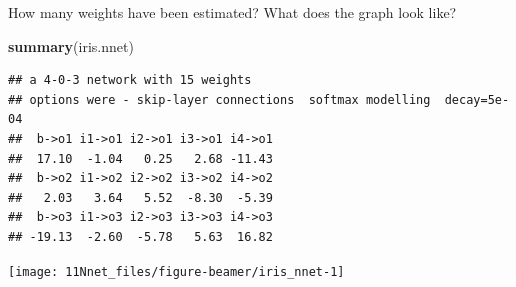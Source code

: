 \documentclass[10pt,ignorenonframetext,]{beamer}
\newenvironment{Shaded}{\begin{snugshade}}{\end{snugshade}}
\newcommand{\KeywordTok}[1]{\textcolor[rgb]{0.13,0.29,0.53}{\textbf{#1}}}
\newcommand{\NormalTok}[1]{#1}
\begin{document}
\begin{frame}[fragile]

How many weights have been estimated? What does the graph look like?

\scriptsize

\begin{Shaded}
\begin{Highlighting}[]
\KeywordTok{summary}\NormalTok{(iris.nnet)}
\end{Highlighting}
\end{Shaded}

\begin{verbatim}
## a 4-0-3 network with 15 weights
## options were - skip-layer connections  softmax modelling  decay=5e-04
##  b->o1 i1->o1 i2->o1 i3->o1 i4->o1 
##  17.10  -1.04   0.25   2.68 -11.43 
##  b->o2 i1->o2 i2->o2 i3->o2 i4->o2 
##   2.03   3.64   5.52  -8.30  -5.39 
##  b->o3 i1->o3 i2->o3 i3->o3 i4->o3 
## -19.13  -2.60  -5.78   5.63  16.82
\end{verbatim}

\end{frame}

\begin{frame}

\begin{center}\texttt{[image: 11Nnet\_files/figure-beamer/iris\_nnet-1]} \end{center}

\end{frame}
\end{document}

